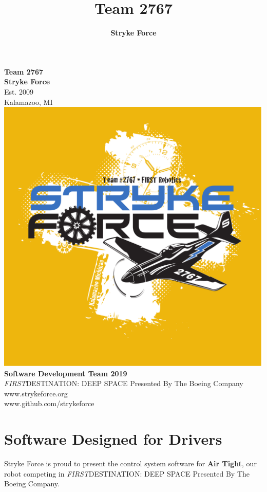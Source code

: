 \documentclass[10pt,tumble]{leaflet}
\title{Team 2767}
\author{\Large\textbf{Stryke Force}}
\begin{document}
\begin{center}
 \LARGE\textbf{Team 2767\\ Stryke Force}\\
 \Large{Est. 2009\\ Kalamazoo, MI}\\
 \vspace{0.5in}
 \includegraphics[scale=0.2]{assets/strykeforce}\\
 \vspace{0.5in}
 \LARGE\textbf{Software Development Team 2019}\vspace{0.5in}\\ \textit{FIRST}\textregistered DESTINATION: DEEP SPACE Presented By The Boeing Company \vspace{0.25in} \\ {\large www.strykeforce.org\\www.github.com/strykeforce}
 \vfill
\end{center}
\clearpage

\section{Software Designed for Drivers}
Stryke Force is proud to present the control system software for \textbf{Air Tight}, our robot competing in \textit{FIRST}\textregistered DESTINATION: DEEP SPACE Presented By The Boeing Company.
\end{document}

